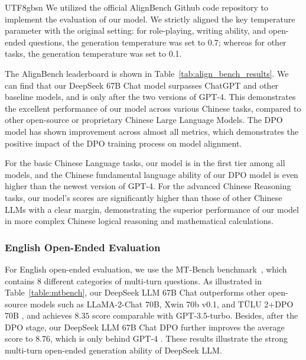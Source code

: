 \documentclass[11pt, a4paper, logo, copyright, nonumbering]{deepseek}
\begin{document}
\begin{CJK*}{UTF8}{gbsn}
We utilized the official AlignBench Github code repository to implement the evaluation of our model. We strictly aligned the key temperature parameter with the original setting: for role-playing, writing ability, and open-ended questions, the generation temperature was set to 0.7; whereas for other tasks, the generation temperature was set to 0.1.

The AlignBench leaderboard is shown in Table~\ref{tab:align_bench_results}. We can find that our DeepSeek 67B Chat model surpasses ChatGPT and other baseline models, and is only after the two versions of GPT-4.
This demonstrates the excellent performance of our model across various Chinese tasks, compared to other open-source or proprietary Chinese Large Language Models. The DPO model has shown improvement across almost all metrics, which demonstrates the positive impact of the DPO training process on model alignment.

For the basic Chinese Language tasks, our model is in the first tier among all models, and the Chinese fundamental language ability of our DPO model is even higher than the newest version of GPT-4.
For the advanced Chinese Reasoning tasks, our model's scores are significantly higher than those of other Chinese LLMs with a clear margin, demonstrating the 
superior performance of our model in more complex Chinese logical reasoning and mathematical calculations.

\subsubsection{English Open-Ended Evaluation}
For English open-ended evaluation, we use the MT-Bench benchmark~\citep{mtbench}, which contains 8 different categories of multi-turn questions.
As illustrated in Table~\ref{table:mtbench}, our DeepSeek LLM 67B Chat outperforms other open-source models such as LLaMA-2-Chat \cite{llama2} 70B, Xwin 70b v0.1, and TÜLU 2+DPO 70B \citep{tulu2}, and achieves $8.35$ score comparable with GPT-3.5-turbo.
Besides, after the DPO stage, our DeepSeek LLM 67B Chat DPO further improves the average score to $8.76$, which is only behind GPT-4 \citep{gpt4}.
These results illustrate the strong multi-turn open-ended generation ability of DeepSeek LLM.


\end{CJK*}
\end{document}
